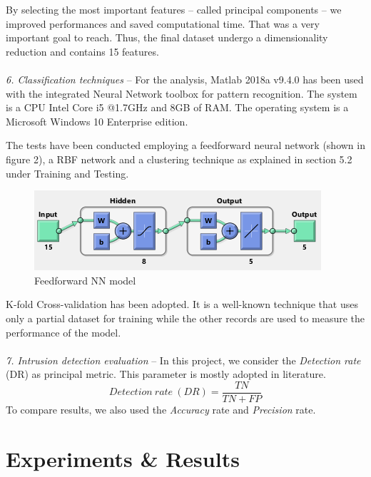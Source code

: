 \documentclass[twocolumn,11pt]{asme2ej}
\begin{document}
By selecting the most important features -- called principal components -- we improved performances and saved computational time. That was a very important goal to reach. Thus, the final dataset undergo a dimensionality reduction and contains 15 features.\\\\
\textit{6. Classification techniques} -- For the analysis, Matlab 2018a v9.4.0 has been used with the integrated Neural Network toolbox for pattern recognition. The system is a CPU Intel Core i5 @1.7GHz and 8GB of RAM. The operating system is a Microsoft Windows 10 Enterprise edition.%

The tests have been conducted employing a feedforward neural network (shown in figure 2), a RBF network and a clustering technique as explained in section 5.2 under Training and Testing. 
\begin{figure}[h]
\centering
\includegraphics[scale=0.8]{ANN_model2.png}
\caption{Feedforward NN model}
\end{figure}
K-fold Cross-validation has been adopted. It is a well-known technique that uses only a partial dataset for training while the other records are used to measure the performance of the model. \\\\
\textit{7. Intrusion detection evaluation} -- In this project, we consider the \textit{Detection rate} (DR) as principal metric. This parameter is mostly adopted in literature.
$$ Detection\ rate\ (DR)= \frac{TN}{TN + FP} $$ To compare results, we also used the \textit{Accuracy} rate and \textit{Precision} rate.


\section{Experiments \& Results}
\end{document}
